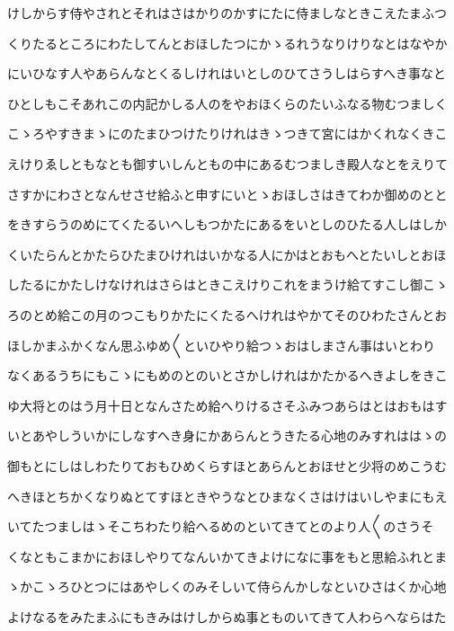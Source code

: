 \documentclass[a4paper,11pt,landscape]{ltjtarticle}
\begin{document}
けしからす侍やされとそれはさはかりのかすにたに侍ましなときこえたまふつ
\par\medskip
くりたるところにわたしてんとおほしたつにかゝるれうなりけりなとはなやか
\par\medskip
にいひなす人やあらんなとくるしけれはいとしのひてさうしはらすへき事なと
\par\medskip
ひとしもこそあれこの内記かしる人のをやおほくらのたいふなる物むつましく
\par\medskip
こゝろやすきまゝにのたまひつけたりけれはきゝつきて宮にはかくれなくきこ
\par\medskip
えけりゑしともなとも御すいしんともの中にあるむつましき殿人なとをえりて
\par\medskip
さすかにわさとなんせさせ給ふと申すにいとゝおほしさはきてわか御めのとと
\par\medskip
をきすらうのめにてくたるいへしもつかたにあるをいとしのひたる人しはしか
\par\medskip
くいたらんとかたらひたまひけれはいかなる人にかはとおもへとたいしとおほ
\par\medskip
したるにかたしけなけれはさらはときこえけりこれをまうけ給てすこし御こゝ
\par\medskip
ろのとめ給この月のつこもりかたにくたるへけれはやかてそのひわたさんとお
\par\medskip
ほしかまふかくなん思ふゆめ〱といひやり給つゝおはしまさん事はいとわり
\par\medskip
なくあるうちにもこゝにもめのとのいとさかしけれはかたかるへきよしをきこ
\par\medskip
ゆ大将とのはう月十日となんさため給へりけるさそふみつあらはとはおもはす
\par\medskip
いとあやしういかにしなすへき身にかあらんとうきたる心地のみすれははゝの
\par\medskip
御もとにしはしわたりておもひめくらすほとあらんとおほせと少将のめこうむ
\par\medskip
へきほとちかくなりぬとてすほときやうなとひまなくさはけはいしやまにもえ
\par\medskip
いてたつましはゝそこちわたり給へるめのといてきてとのより人〱のさうそ
\par\medskip
くなともこまかにおほしやりてなんいかてきよけになに事をもと思給ふれとま
\par\medskip
ゝかこゝろひとつにはあやしくのみそしいて侍らんかしなといひさはくか心地
\par\medskip
よけなるをみたまふにもきみはけしからぬ事とものいてきて人わらへならはた
\par\medskip
\end{document}
